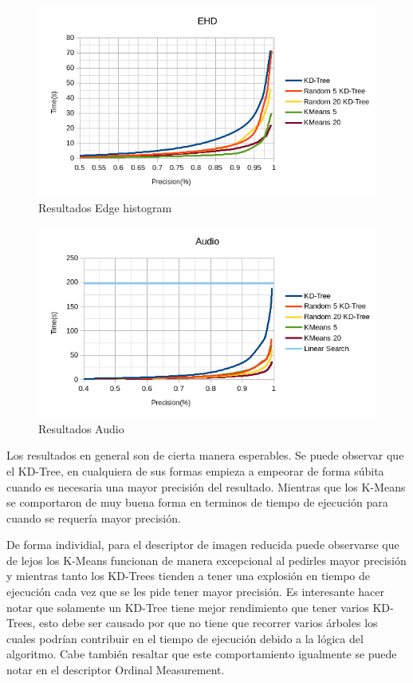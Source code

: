 \documentclass{article}
\begin{document}
	\begin{figure}
		\includegraphics[width=\linewidth]{ehd.png}
		\caption{Resultados Edge histogram}
	\end{figure}
	\begin{figure}
		\includegraphics[width=\linewidth]{audio.png}
		\caption{Resultados Audio}
	\end{figure}
	Los resultados en general son de cierta manera esperables. Se puede observar que el KD-Tree, en cualquiera de sus formas empieza a empeorar de forma súbita cuando es necesaria una mayor precisión del resultado. Mientras que los K-Means se comportaron de muy buena forma en terminos de tiempo de ejecución para cuando se requería mayor precisión.
	
	De forma individial, para el descriptor de imagen reducida puede observarse que de lejos los K-Means funcionan de manera excepcional al pedirles mayor precisión y mientras tanto los KD-Trees tienden a tener una explosión en tiempo de ejecución cada vez que se les pide tener mayor precisión. Es interesante hacer notar que solamente un KD-Tree tiene mejor rendimiento que tener varios KD-Trees, esto debe ser causado por que no tiene que recorrer varios árboles los cuales podrían contribuir en el tiempo de ejecución debido a la lógica del algoritmo. Cabe también resaltar que este comportamiento igualmente se puede notar en el descriptor Ordinal Measurement.
	
\end{document}
